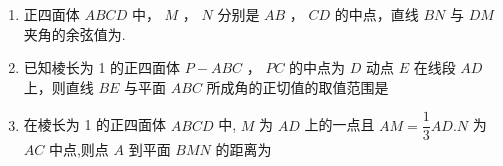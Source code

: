 \begin{enumerate}
\begin{jieda}
        则 ${BD} = \dfrac{a}{2},{AD} = \dfrac{\sqrt{3}}{2}a,{OA} = \dfrac{2}{3}{AD} = \dfrac{\sqrt{3}}{3}a,{OD} = \dfrac{1}{3}{AD} = \dfrac{\sqrt{3}}{6}a$ ,
        
        在 Rt $\bigtriangleup {APO}$ 中, ${OP} = \sqrt{A{P}^{2} - O{A}^{2}} = \sqrt{{a}^{2} - \dfrac{1}{3}{a}^{2}} = \dfrac{\sqrt{6}}{3}a$ ,
        
        则 $A\left( {0, - \dfrac{\sqrt{3}}{3}a,0}\right) ,B\left( {\dfrac{a}{2},\dfrac{\sqrt{3}}{6}a,0}\right) ,P\left( {0,0,\dfrac{\sqrt{6}}{3}a}\right)$ ,
        
        则 $\vv{AP} = \left( {0,\dfrac{\sqrt{3}}{3}a,\dfrac{\sqrt{6}}{3}a}\right) ,\vv{BP} = \left( {-\dfrac{a}{2}, - \dfrac{\sqrt{3}}{6}a,\dfrac{\sqrt{6}}{3}a}\right)$ ,
        
        设平面 ${PAB}$ 的法向量为 $\vv{m} = \left( {x,y,z}\right)$ ,
        
        则 $\left\{  \begin{array}{l} \vv{AP} \cdot  \vv{m} = \dfrac{\sqrt{3}}{3}{ay} + \dfrac{\sqrt{6}}{3}{az} = 0 \\  \vv{BP} \cdot  \vv{m} =  - \dfrac{a}{2}x - \dfrac{\sqrt{3}}{6}{ay} + \dfrac{\sqrt{6}}{3}{az} = 0 \end{array}\right.$ ,令 $z = 1$ ,则 $y =  - \sqrt{2},x = \sqrt{6}$ ,则 $\vv{m} = \left( {\sqrt{6}, - \sqrt{2},1}\right)$ ,
        
        因为 ${OA} \bot  l,l \subset$ 平面 ${ABC}$ ,则直线 $l$ 的一个方向向量为 $\vv{n} = \left( {1,0,0}\right)$ ,
        
        设直线 $l$ 与侧面 ${PAB}$ 所成角为 $a$ ,则 $\sin a = \left| {\cos \langle \vv{m},\vv{n}\rangle }\right|  = \dfrac{\left| \vv{m} \cdot  \vv{n}\right| }{\left| \vv{m}\right| \left| \vv{n}\right| } = \dfrac{\sqrt{6}}{\sqrt{{\left( \sqrt{6}\right) }^{2} + {\left( -\sqrt{2}\right) }^{2} + {1}^{2}}} = \dfrac{\sqrt{6}}{3}$ ,
        
        所以直线 $l$ 与侧面 ${PAB}$ 所成角的正弦值为 $\dfrac{\sqrt{6}}{3}$ .
    \end{jieda}
    
    \item 正四面体 ${ABCD}$ 中， $M$ ， $N$ 分别是 ${AB}$ ， ${CD}$ 的中点，直线 ${BN}$ 与 ${DM}$ 夹角的余弦值为.
    
    \item 已知棱长为 1 的正四面体 $P - {ABC}$ ， ${PC}$ 的中点为 $D$ 动点 $E$ 在线段 ${AD}$ 上，则直线 ${BE}$ 与平面 ${ABC}$ 所成角的正切值的取值范围是 
    
    \item 在棱长为 1 的正四面体 ${ABCD}$ 中, $M$ 为 ${AD}$ 上的一点且 ${AM} = \dfrac{1}{3}{AD}.N$ 为 ${AC}$ 中点,则点 $A$ 到平面 ${BMN}$ 的距离为

\end{enumerate}

